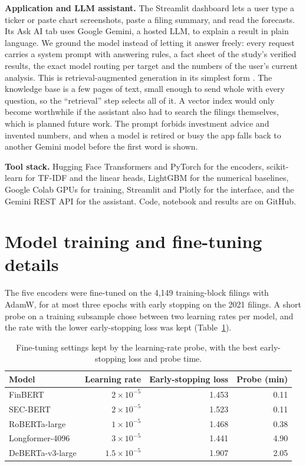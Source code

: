 \documentclass[11pt,a4paper]{article}
\begin{document}
\textbf{Application and LLM assistant.} The Streamlit dashboard lets a user type a ticker or paste chart screenshots, paste a filing summary, and read the forecasts. Its Ask AI tab uses Google Gemini, a hosted LLM, to explain a result in plain language. We ground the model instead of letting it answer freely: every request carries a system prompt with answering rules, a fact sheet of the study's verified results, the exact model routing per target and the numbers of the user's current analysis. This is retrieval-augmented generation in its simplest form \cite{lewis2020rag}. The knowledge base is a few pages of text, small enough to send whole with every question, so the ``retrieval'' step selects all of it. A vector index would only become worthwhile if the assistant also had to search the filings themselves, which is planned future work. The prompt forbids investment advice and invented numbers, and when a model is retired or busy the app falls back to another Gemini model before the first word is shown.

\textbf{Tool stack.} Hugging Face Transformers and PyTorch for the encoders, scikit-learn for TF-IDF and the linear heads, LightGBM for the numerical baselines, Google Colab GPUs for training, Streamlit and Plotly for the interface, and the Gemini REST API for the assistant. Code, notebook and results are on GitHub.

\section{Model training and fine-tuning details}

The five encoders were fine-tuned on the 4,149 training-block filings with AdamW, for at most three epochs with early stopping on the 2021 filings. A short probe on a training subsample chose between two learning rates per model, and the rate with the lower early-stopping loss was kept (Table~\ref{tab:lr}).

\begin{table}[h]
\centering
\caption{Fine-tuning settings kept by the learning-rate probe, with the best early-stopping loss and probe time.}
\label{tab:lr}
\begin{tabular}{lrrr}
\toprule
Model & Learning rate & Early-stopping loss & Probe (min) \\
\midrule
FinBERT & $2\times10^{-5}$ & 1.453 & 0.11 \\
SEC-BERT & $2\times10^{-5}$ & 1.523 & 0.11 \\
RoBERTa-large & $1\times10^{-5}$ & 1.468 & 0.38 \\
Longformer-4096 & $3\times10^{-5}$ & 1.441 & 4.90 \\
DeBERTa-v3-large & $1.5\times10^{-5}$ & 1.907 & 2.05 \\
\bottomrule
\end{tabular}
\end{table}
\end{document}

